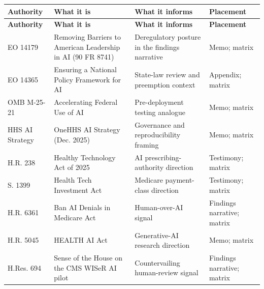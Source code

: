 \documentclass[11pt]{article}
\begin{document}
{\footnotesize
\begin{xltabular}{\textwidth}{L{2.1cm} L{4.3cm} Y L{2.5cm}}
\hline
\textbf{Authority} & \textbf{What it is} & \textbf{What it informs} &
\textbf{Placement}\\
\hline
\endfirsthead
\hline
\textbf{Authority} & \textbf{What it is} & \textbf{What it informs} &
\textbf{Placement}\\
\hline
\endhead
\hline
\endlastfoot
EO 14179 & Removing Barriers to American Leadership in AI (90 FR 8741) &
Deregulatory posture in the findings narrative \cite{eo-14179} & Memo; matrix\\
EO 14365 & Ensuring a National Policy Framework for AI & State-law review and
preemption context \cite{eo-14365} & Appendix; matrix\\
OMB M-25-21 & Accelerating Federal Use of AI & Pre-deployment testing analogue
\cite{omb-m2521} & Memo; matrix\\
HHS AI Strategy & OneHHS AI Strategy (Dec. 2025) & Governance and reproducibility
framing \cite{hhs-ai-strategy-2025} & Memo; matrix\\
H.R. 238 & Healthy Technology Act of 2025 & AI prescribing-authority direction
\cite{hr238-healthy-tech} & Testimony; matrix\\
S. 1399 & Health Tech Investment Act & Medicare payment-class direction
\cite{s1399-health-tech-investment} & Testimony; matrix\\
H.R. 6361 & Ban AI Denials in Medicare Act & Human-over-AI signal
\cite{hr6361-ban-ai-denials} & Findings narrative; matrix\\
H.R. 5045 & HEALTH AI Act & Generative-AI research direction
\cite{hr5045-health-ai} & Memo; matrix\\
H.Res. 694 & Sense of the House on the CMS WISeR AI pilot & Countervailing
human-review signal \cite{hres694-wiser} & Findings narrative; matrix\\
\end{xltabular}}

\clearpage
{}
{}

\end{document}
